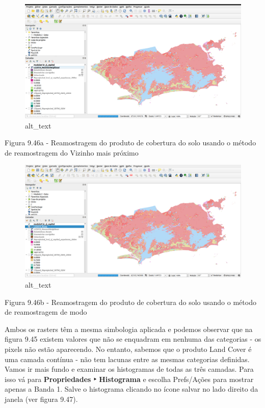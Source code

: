 \documentclass[
]{book}
\begin{document}
\begin{figure}
\centering
\includegraphics{media/modulo9/fig946_a.png}
\caption{alt\_text}
\end{figure}

Figura 9.46a - Reamostragem do produto de cobertura do solo usando o método de reamostragem do Vizinho mais próximo

\begin{figure}
\centering
\includegraphics{media/modulo9/fig946_b.png}
\caption{alt\_text}
\end{figure}

Figura 9.46b - Reamostragem do produto de cobertura do solo usando o método de reamostragem de modo

Ambos os rasters têm a mesma simbologia aplicada e podemos observar que na figura 9.45 existem valores que não se enquadram em nenhuma das categorias - os pixels não estão aparecendo. No entanto, sabemos que o produto Land Cover é uma camada contínua - não tem lacunas entre as mesmas categorias definidas. Vamos ir mais fundo e examinar os histogramas de todas as três camadas. Para isso vá para \textbf{Propriedades ‣ Histograma} e escolha Prefs/Ações para mostrar apenas a Banda 1. Salve o histograma clicando no ícone salvar no lado direito da janela (ver figura 9.47).
\end{document}
